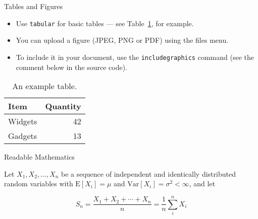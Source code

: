 \documentclass{beamer}
\begin{document}
\begin{frame}{Tables and Figures}

	\begin{itemize}
		\item Use \texttt{tabular} for basic tables --- see Table~\ref{tab:widgets}, for example.
		\item You can upload a figure (JPEG, PNG or PDF) using the files menu. 
		\item To include it in your document, use the \texttt{includegraphics} command (see the comment below in the source code).
	\end{itemize}


	\begin{table}
		\centering
		\begin{tabular}{l|r}
			Item & Quantity \\\hline
			Widgets & 42 \\
			Gadgets & 13
		\end{tabular}
		\caption{\label{tab:widgets}An example table.}
	\end{table}

\end{frame}


\begin{frame}{Readable Mathematics}

	Let $X_1, X_2, \ldots, X_n$ be a sequence of independent and identically 
	distributed random variables with $\text{E}[X_i] = \mu$ and 
	$\text{Var}[X_i] = \sigma^2 < \infty$, and let
	
	$$S_n = \frac{X_1 + X_2 + \cdots + X_n}{n} = \frac{1}{n}\sum_{i}^{n} X_i$$

\end{frame}
\end{document}
